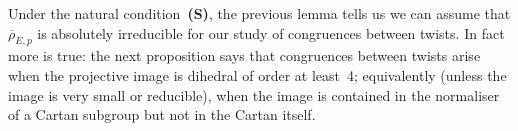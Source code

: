 \documentclass[12pt, reqno]{amsart}
\newcommand{\PP}{\mathbb{P}}
\newcommand{\Z}{\mathbb{Z}}
\newcommand{\rhobar}{{\overline{\rho}}}
\numberwithin{equation}{section}
\theoremstyle{definition}
\theoremstyle{remark}
\newcommand{\condS}{condition~{\bf (S)}}
\begin{document}
Under the natural \condS, the previous lemma tells us we can assume
that $\rhobar_{E,p}$ is absolutely irreducible for our study of
congruences between twists. In fact more is true: the next proposition
says that congruences between twists arise when the projective image
is dihedral of order at least~4; equivalently (unless the image is
very small or reducible), when the image is contained in the
normaliser of a Cartan subgroup but not in the Cartan itself.

\begin{comment} %
In the rest of this section we will study elliptic curves whose
mod~$p$ representations are projectively dihedral: that is, such that
$\PP \rhobar_{E,p} (G_K) \simeq D_{n}$.  This includes, but is not
restricted to, curves with CM where the extra endomorphisms are not
defined over the ground field.  In the following two subsections we
specialise to the case of curves CM by $\Z[\zeta_4]$ and $\Z[\zeta_6]$
where quartic and sextic twists are possible.  In this subsection we
restrict to quadratic twists, together with the special quartic twist
(see Remark~\ref{R:2-isog}) which becomes trivial over a quadratic
extension.

When $\PP \rhobar_{E,p} (G_K) \simeq D_{n}$, let~$K(\sqrt{d})$ be the
quadratic extension cut out by a cyclic subgroup~$C_n<D_n$ of
index~$2$.  This cyclic subgroup is unique, except when $n=2$ when
there are three possibilities for~$C_2<D_2\cong C_2\times C_2$, and
hence for $K(\sqrt{d})$. In this situation, we will see that
$E[p]\cong E^d[p]$ as $G_K$-modules, and we will determine the
symplectic type of this isomorphism.  This is in accordance with
Theorem~\ref{T:constraint}, since in passing from $K$
to~$K(\sqrt{d})$, the projective image becomes cyclic and hence
(absolutely) reducible.

First we exclude some degenerate cases, where the projective image is
very small, in which case this symplectic type is not well-defined.


\end{comment}
\end{document}
